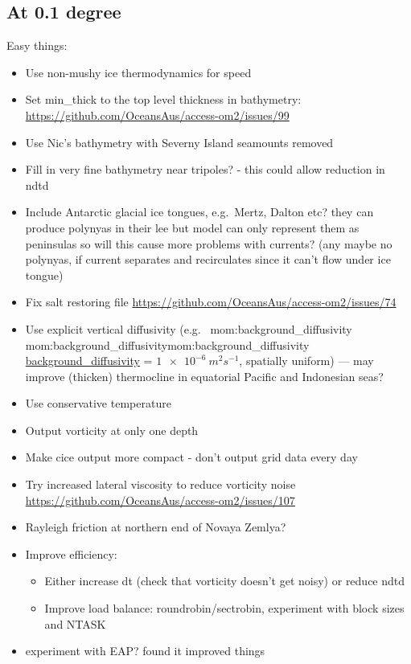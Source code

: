 \documentclass[11pt]{article}
\makeatletter
\newcommand*{\make@hex@label}[1]{%
  \def\hex@label{#1}%
  \@onelevel@sanitize\hex@label
  \EdefEscapeHex\hex@label{\hex@label}%
}
\newcommand*{\hexhyperlink}[2]{%
  \make@hex@label{#1}%
  \hyperlink{\hex@label}{#2}%
}
\newcommand{\momlink}[2]{\hexhyperlink{mom:#2}{#1}}
\newcommand{\param}[1]{\textsf{#1}}
\newcommand{\mom}[1]{\param{\momlink{#1}{#1}}}
\makeatother
\begin{document}
\subsection{At 0.1 degree}
Easy things:
\begin{itemize}
\item Use non-mushy ice thermodynamics for speed
\item Set min_thick to the top level thickness in bathymetry: \url{https://github.com/OceansAus/access-om2/issues/99}
\item Use Nic's bathymetry with Severny Island seamounts removed
\item Fill in very fine bathymetry near tripoles? - this could allow reduction in ndtd
\item Include Antarctic glacial ice tongues, e.g.\ Mertz, Dalton etc? they can produce polynyas in their lee but model can only represent them as peninsulas so will this cause more problems with currents? (any maybe no polynyas, if current separates and recirculates since it can't flow under ice tongue)
\item Fix salt restoring file \url{https://github.com/OceansAus/access-om2/issues/74}
\item Use explicit vertical diffusivity (e.g.\ \mom{background_diffusivity} = $\SI{1e-6}{m^2s^{-1}}$, spatially uniform) --- may improve (thicken) thermocline in equatorial Pacific and Indonesian seas?
\item Use conservative temperature
\item Output vorticity at only one depth
\item Make cice output more compact - don't output grid data every day
\item Try increased lateral viscosity to reduce vorticity noise \url{https://github.com/OceansAus/access-om2/issues/107}
\item Rayleigh friction at northern end of Novaya Zemlya?
\item Improve efficiency:
\begin{itemize}
\item Either increase dt (check that vorticity doesn't get noisy) or reduce ndtd
\item Improve load balance: roundrobin/sectrobin, experiment with block sizes and NTASK
\end{itemize}
\item experiment with EAP? \citet{Naughten2018a} found it improved things
\end{itemize}
\end{document}

